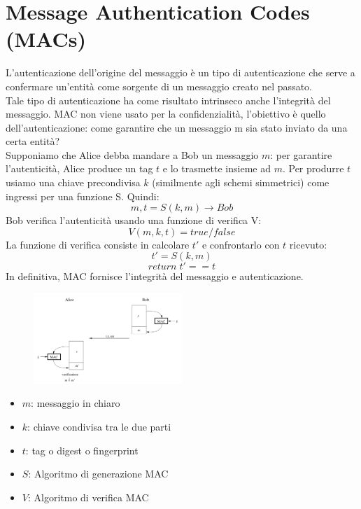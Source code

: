 \documentclass[a4paper,12pt]{article}
\begin{document}
\newpage

\section{Message Authentication Codes (MACs)}
L'autenticazione dell'origine del messaggio è un tipo di autenticazione che serve a confermare un'entità come sorgente di un messaggio creato nel passato. \\ 
Tale tipo di autenticazione ha come risultato intrinseco anche l'integrità del messaggio.
MAC non viene usato per la confidenzialità, l'obiettivo è quello dell'autenticazione: come garantire che un messaggio m sia stato inviato da una certa entità? \\
Supponiamo che Alice debba mandare a Bob un messaggio $m$: per garantire l'autenticità, Alice produce un tag $t$ e lo trasmette insieme ad $m$. 
Per produrre $t$ usiamo una chiave precondivisa $k$ (similmente agli schemi simmetrici) come ingressi per una funzione S. Quindi:
$$ m,t = S(k,m) \rightarrow Bob$$
Bob verifica l'autenticità usando una funzione di verifica V:
$$V(m,k,t) = true/false$$
La funzione di verifica consiste in calcolare $t'$ e confrontarlo con $t$ ricevuto:
$$t' = S(k,m)$$
$$return\;t' == t$$
In definitiva, MAC fornisce l'integrità del messaggio e autenticazione.

\begin{figure}[H]
  \centering
  \includegraphics[width=0.5\textwidth]{img/mac}
\end{figure}

\begin{itemize}
	\item $m$: messaggio in chiaro
	\item $k$: chiave condivisa tra le due parti
	\item $t$: tag o digest o fingerprint
	\item $S$: Algoritmo di generazione MAC
	\item $V$: Algoritmo di verifica MAC
\end{itemize}
\end{document}
